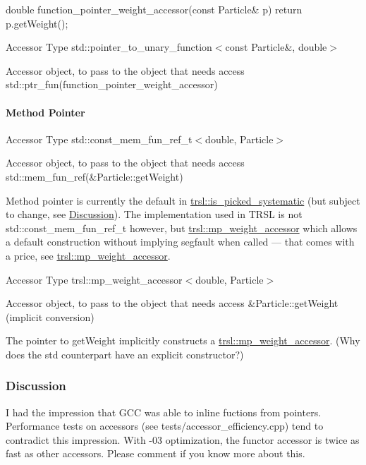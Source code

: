 \begin{DoxyCode}
 double function_pointer_weight_accessor(const Particle& p)
 { return p.getWeight(); }
\end{DoxyCode}



\begin{DoxyDescription}
\item[Accessor Type ]{\ttfamily std::pointer\_\-to\_\-unary\_\-function$<$const Particle\&, double$>$} 
\item[Accessor object, to pass to the object that needs access ]{\ttfamily std::ptr\_\-fun(function\_\-pointer\_\-weight\_\-accessor)} 
\end{DoxyDescription}\hypertarget{group__accessor_accessor_methodpointer}{}\paragraph{Method Pointer}\label{group__accessor_accessor_methodpointer}

\begin{DoxyDescription}
\item[Accessor Type ]{\ttfamily std::const\_\-mem\_\-fun\_\-ref\_\-t$<$double, Particle$>$} 
\item[Accessor object, to pass to the object that needs access ]{\ttfamily std::mem\_\-fun\_\-ref(\&Particle::getWeight)} 
\end{DoxyDescription}

Method pointer is currently the default in \hyperlink{classtrsl_1_1is__picked__systematic}{trsl::is\_\-picked\_\-systematic} (but subject to change, see \hyperlink{group__accessor_accessor_discussion}{Discussion}). The implementation used in TRSL is not std::const\_\-mem\_\-fun\_\-ref\_\-t however, but \hyperlink{classtrsl_1_1mp__weight__accessor}{trsl::mp\_\-weight\_\-accessor} which allows a default construction without implying segfault when called --- that comes with a price, see \hyperlink{classtrsl_1_1mp__weight__accessor}{trsl::mp\_\-weight\_\-accessor}.


\begin{DoxyDescription}
\item[Accessor Type ]{\ttfamily trsl::mp\_\-weight\_\-accessor$<$double, Particle$>$} 
\item[Accessor object, to pass to the object that needs access ]{\ttfamily \&Particle::getWeight} (implicit conversion) 
\end{DoxyDescription}

The pointer to {\ttfamily getWeight} implicitly constructs a \hyperlink{classtrsl_1_1mp__weight__accessor}{trsl::mp\_\-weight\_\-accessor}. (Why does the std counterpart have an explicit constructor?)\hypertarget{group__accessor_accessor_discussion}{}\subsubsection{Discussion}\label{group__accessor_accessor_discussion}
I had the impression that GCC was able to inline fuctions from pointers. Performance tests on accessors (see {\ttfamily tests/accessor\_\-efficiency.cpp}) tend to contradict this impression. With {\ttfamily -\/03} optimization, the functor accessor is twice as fast as other accessors. Please comment if you know more about this. 